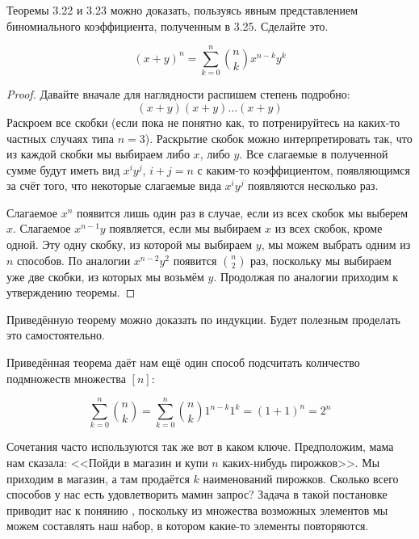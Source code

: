 \begin{exercise}
Теоремы 3.22 и 3.23 можно доказать, пользуясь явным представлением биномиального коэффициента, полученным в 3.25. Сделайте это.
\end{exercise}

\begin{thm}
$$(x+y)^n = \sum_{k=0}^n {n \choose k} x^{n-k} y^k$$
\end{thm}
\begin{proof}
Давайте вначале для наглядности распишем степень подробно:
$$(x+y)(x+y)\ldots(x+y)$$
Раскроем все скобки (если пока не понятно как, то потренируйтесь на каких-то частных случаях типа $n=3$). Раскрытие скобок можно интерпретировать так, что из каждой скобки мы выбираем либо $x$, либо $y$. Все слагаемые в полученной сумме будут иметь вид $x^iy^j$, $i+j=n$ с каким-то коэффициентом, появляющимся за счёт того, что некоторые слагаемые вида $x^iy^j$ появляются несколько раз.

Слагаемое $x^n$ появится лишь один раз в случае, если из всех скобок мы выберем $x$. Слагаемое $x^{n-1}y$ появляется, если мы выбираем $x$ из всех скобок, кроме одной. Эту одну скобку, из которой мы выбираем $y$, мы можем выбрать одним из $n$ способов. По аналогии $x^{n-2}y^2$ появится $n\choose 2$ раз, поскольку мы выбираем уже две скобки, из которых мы возьмём $y$. Продолжая по аналогии приходим к утверждению теоремы.
\end{proof}

\begin{exercise}
Приведённую теорему можно доказать по индукции. Будет полезным проделать это самостоятельно.
\end{exercise}

Приведённая теорема даёт нам ещё один способ подсчитать количество подмножеств множества $[n]$:

$$\sum_{k=0}^n {n \choose k} = \sum_{k=0}^n {n \choose k}1^{n-k}1^k = (1+1)^n = 2^n$$

Сочетания часто используются так же вот в каком ключе. Предположим, мама нам сказала: <<Пойди в магазин и купи $n$ каких-нибудь пирожков>>. Мы приходим в магазин, а там продаётся $k$ наименований пирожков. Сколько всего способов у нас есть удовлетворить мамин запрос? Задача в такой постановке приводит нас к понянию , поскольку из множества возможных элементов мы можем составлять наш набор, в котором какие-то элементы повторяются.

